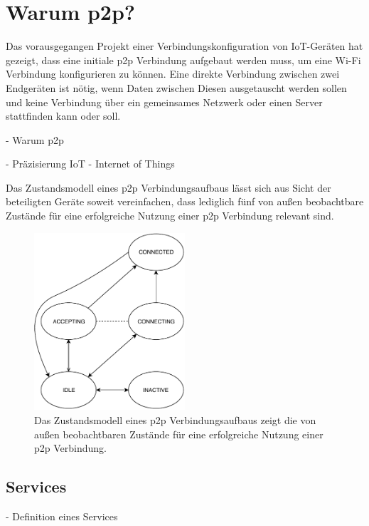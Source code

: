 \section{Warum p2p?}
    Das vorausgegangen Projekt einer Verbindungskonfiguration von IoT-Geräten \linebreak \cite{aiProject} hat gezeigt, dass eine initiale p2p Verbindung aufgebaut werden muss, um eine Wi-Fi Verbindung konfigurieren zu können. Eine direkte Verbindung zwischen zwei Endgeräten ist nötig, wenn Daten zwischen Diesen ausgetauscht werden sollen und keine Verbindung über ein gemeinsames Netzwerk oder einen Server stattfinden kann oder soll. 
    
    - Warum p2p

    - Präzisierung IoT - Internet of Things
    
Das Zustandsmodell  eines p2p Verbindungsaufbaus lässt sich aus Sicht der beteiligten Geräte soweit vereinfachen, dass lediglich fünf von außen beobachtbare Zustände für eine erfolgreiche Nutzung einer p2p Verbindung relevant sind.
    
	\begin{figure}[ht]
         \centering
	      \includegraphics[width=0.5\textwidth]{p2p-State.pdf}
    	   \caption[Zustandsmodell eines p2p Verbindungsaufbaus]{Das Zustandsmodell eines p2p Verbindungsaufbaus zeigt die von außen beobachtbaren Zustände für eine erfolgreiche Nutzung einer p2p Verbindung. } \label{p2p:state}
	\end{figure}       
    
    \subsection{Services}
    - Definition eines Services
    
